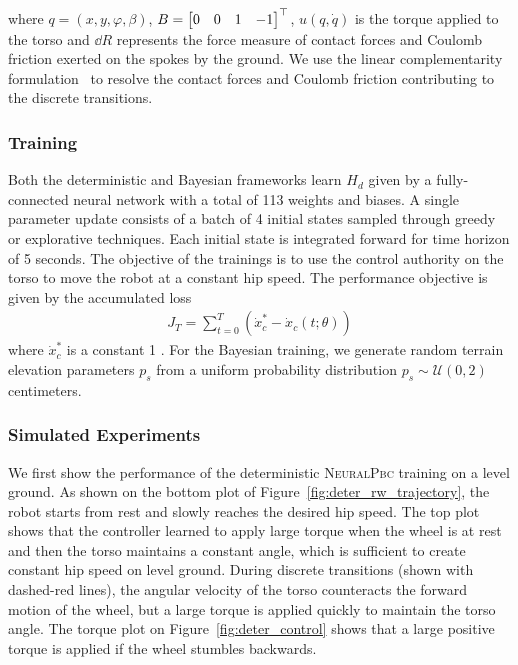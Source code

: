 \noindent where $q = (x, y, \varphi, \beta)$, $B = \begin{bmatrix}0 & 0 & 1 & -1\end{bmatrix}^\top$,
$u(q, \dot{q})$ is the torque applied to the torso and $\dd R$ represents the
force measure of contact forces and Coulomb friction exerted on the spokes by
the ground. We use the linear complementarity
formulation~\cite{glocker2005formulation} to resolve the contact forces and
Coulomb friction contributing to the discrete transitions.


\subsubsection{Training}
\label{sssec:training}

Both the deterministic and Bayesian frameworks learn $H_d$ given by a
fully-connected neural network with a total of 113 weights and biases.   
%
A single parameter update consists of a batch of 4 initial states sampled
through greedy or explorative techniques.
%
Each initial state is integrated forward for time horizon of 5 seconds.
%
The objective of the trainings is to use the control authority on the torso to
move the robot at a constant hip speed.
%
The performance objective is given by the accumulated loss
\begin{align}
    J_T = \sum_{t=0}^{T} (\dot{x}_c^* - \dot{x}_c(t; \theta))
    \label{eq:loss}
\end{align}
\noindent where $\dot{x}_c^*$ is a constant 1 .
%
For the Bayesian training, we generate random terrain elevation parameters $p_s$
from a uniform probability distribution $p_s \sim \mathcal{U}(0, 2)$ centimeters.


\subsubsection{Simulated Experiments}

We first show the performance of the deterministic \textsc{NeuralPbc} training
on a level ground.
%
As shown on the bottom plot of Figure~\ref{fig:deter_rw_trajectory}, the robot
starts from rest and slowly reaches the desired hip speed.
%
The top plot shows that the controller learned to apply large torque
when the wheel is at rest and then the torso maintains a constant angle, which
is sufficient to create constant hip speed on level ground.  
%
During discrete transitions (shown with dashed-red lines), the angular velocity
of the torso counteracts the forward motion of the wheel, but a large torque is
applied quickly to maintain the torso angle.
%
The torque plot on Figure~\ref{fig:deter_control} shows that a large
positive torque is applied if the wheel stumbles backwards.
%

